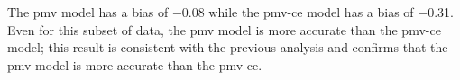 The \ac{pmv} model has a bias of \num{-.08} while the \ac{pmv-ce} model has a bias of \num{-.31}. Even for this subset of data, the \ac{pmv} model is more accurate than the \ac{pmv-ce} model; this result is consistent with the previous analysis and confirms that the \ac{pmv} model is more accurate than the \ac{pmv-ce}.